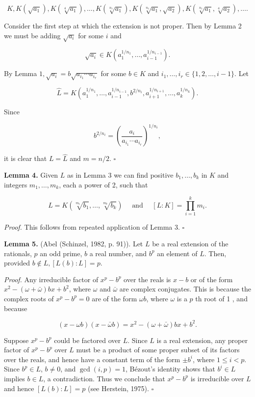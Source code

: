\documentclass[11pt,letterpaper]{article}
\begin{document}
\[
K, K\left(\sqrt{a_{1}}\right), K\left(\sqrt[4]{a_{1}}\right), \ldots, K\left(\sqrt[n_{1}]{a_{1}}\right), K\left(\sqrt[n_{1}]{a_{1}}, \sqrt{a_{2}}\right), K\left(\sqrt[n_{1}]{a_{1}}, \sqrt[4]{a_{2}}\right), \ldots .
\]

Consider the first step at which the extension is not proper. Then by Lemma 2 we must be adding $\sqrt{a_{i}}$ for some $i$ and

\[
\sqrt{a_{i}} \in K\left(a_{1}^{1 / n_{1}}, \ldots, a_{i-1}^{1/n_{i-1}}\right) .
\]

By Lemma $1, \sqrt{a_{i}}=b \sqrt{a_{i_{1}} \cdots a_{i_{r}}}$ for some $b \in K$ and $i_{1}, \ldots, i_{r} \in\{1,2, \ldots, i-1\}$. Let

\[
\hat{L}=K\left(a_{1}^{1 / n_{1}}, \ldots, a_{i-1}^{1/n_{i-1}}, b^{2 / n_{i}}, a_{i+1}^{1/n_{i+1}}, \ldots, a_{k}^{1 / n_{k}}\right) .
\]

Since

\[
b^{2 / n_{i}}=\left(\frac{a_{i}}{a_{i_{1}} \cdots a_{i_{r}}}\right)^{1 / n_{i}},
\]

it is clear that $L=\hat{L}$ and $m=n / 2$. \(\square\)

\noindent\textbf{Lemma 4.} Given $L$ as in Lemma 3 we can find positive $b_{1}, \ldots, b_{k}$ in $K$ and integers $m_{1}, \ldots, m_{k}$, each a power of 2, such that

\[
L=K\left(\sqrt[m_{1}]{b_{1}}, \ldots, \sqrt[m_{k}]{b_{k}}\right) \quad \text { and } \quad[L: K]=\prod_{i=1}^{k} m_{i} .
\]

\noindent\textit{Proof.} This follows from repeated application of Lemma 3. \(\square\)

\noindent\textbf{Lemma 5.} (Abel (Schinzel, 1982, p. 91)). Let $L$ be a real extension of the rationals, $p$ an odd prime, $b$ a real number, and $b^{p}$ an element of $L$. Then, provided $b \notin L,[L(b): L]=p$.

\noindent\textit{Proof.} Any irreducible factor of $x^{p}-b^{p}$ over the reals is $x-b$ or of the form $x^{2}-(\omega+\bar{\omega}) b x+b^{2}$, where $\omega$ and $\bar{\omega}$ are complex conjugates. This is because the complex roots of $x^{p}-b^{p}=0$ are of the form $\omega b$, where $\omega$ is a $p$ th root of 1 , and because

\[
(x-\omega b)(x-\bar\omega b)=x^2-(\omega+\bar\omega)bx+b^2.
\]

Suppose $x^{p}-b^{p}$ could be factored over $L$. Since $L$ is a real extension, any proper factor of $x^{p}-b^{p}$ over $L$ must be a product of some proper subset of its factors over the reals, and hence have a constant term of the form $\pm b^i$, where $1\leq i<p$. Since $b^p\in L$, $b\ne0$, and $\gcd(i,p)=1$, Bézout's identity shows that $b^i\in L$ implies $b\in L$, a contradiction. Thus we conclude that $x^{p}-b^{p}$ is irreducible over $L$ and hence $[L(b): L]=p$ (see Herstein, 1975). \(\square\)
\end{document}
